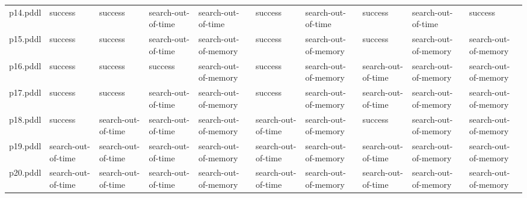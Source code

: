\documentclass{article}
\begin{document}
\begin{tabular}{@{}lrrrrrrrrr@{}}
p14.pddl & \multicolumn{1}{|l|}{success} & \multicolumn{1}{|l|}{success} & \multicolumn{1}{|l|}{search-out-of-time} & \multicolumn{1}{|l|}{search-out-of-time} & \multicolumn{1}{|l|}{success} & \multicolumn{1}{|l|}{search-out-of-time} & \multicolumn{1}{|l|}{success} & \multicolumn{1}{|l|}{search-out-of-time} & \multicolumn{1}{|l|}{success} \\
p15.pddl & \multicolumn{1}{|l|}{success} & \multicolumn{1}{|l|}{success} & \multicolumn{1}{|l|}{search-out-of-time} & \multicolumn{1}{|l|}{search-out-of-memory} & \multicolumn{1}{|l|}{success} & \multicolumn{1}{|l|}{search-out-of-memory} & \multicolumn{1}{|l|}{success} & \multicolumn{1}{|l|}{search-out-of-memory} & \multicolumn{1}{|l|}{search-out-of-memory} \\
p16.pddl & \multicolumn{1}{|l|}{success} & \multicolumn{1}{|l|}{success} & \multicolumn{1}{|l|}{success} & \multicolumn{1}{|l|}{search-out-of-memory} & \multicolumn{1}{|l|}{success} & \multicolumn{1}{|l|}{search-out-of-memory} & \multicolumn{1}{|l|}{search-out-of-time} & \multicolumn{1}{|l|}{search-out-of-memory} & \multicolumn{1}{|l|}{search-out-of-memory} \\
p17.pddl & \multicolumn{1}{|l|}{success} & \multicolumn{1}{|l|}{success} & \multicolumn{1}{|l|}{search-out-of-time} & \multicolumn{1}{|l|}{search-out-of-memory} & \multicolumn{1}{|l|}{success} & \multicolumn{1}{|l|}{search-out-of-memory} & \multicolumn{1}{|l|}{search-out-of-time} & \multicolumn{1}{|l|}{search-out-of-memory} & \multicolumn{1}{|l|}{search-out-of-memory} \\
p18.pddl & \multicolumn{1}{|l|}{success} & \multicolumn{1}{|l|}{search-out-of-time} & \multicolumn{1}{|l|}{search-out-of-time} & \multicolumn{1}{|l|}{search-out-of-memory} & \multicolumn{1}{|l|}{search-out-of-time} & \multicolumn{1}{|l|}{search-out-of-memory} & \multicolumn{1}{|l|}{success} & \multicolumn{1}{|l|}{search-out-of-memory} & \multicolumn{1}{|l|}{search-out-of-memory} \\
p19.pddl & \multicolumn{1}{|l|}{search-out-of-time} & \multicolumn{1}{|l|}{search-out-of-time} & \multicolumn{1}{|l|}{search-out-of-time} & \multicolumn{1}{|l|}{search-out-of-memory} & \multicolumn{1}{|l|}{search-out-of-time} & \multicolumn{1}{|l|}{search-out-of-memory} & \multicolumn{1}{|l|}{search-out-of-time} & \multicolumn{1}{|l|}{search-out-of-memory} & \multicolumn{1}{|l|}{search-out-of-memory} \\
p20.pddl & \multicolumn{1}{|l|}{search-out-of-time} & \multicolumn{1}{|l|}{search-out-of-time} & \multicolumn{1}{|l|}{search-out-of-time} & \multicolumn{1}{|l|}{search-out-of-memory} & \multicolumn{1}{|l|}{search-out-of-time} & \multicolumn{1}{|l|}{search-out-of-memory} & \multicolumn{1}{|l|}{search-out-of-time} & \multicolumn{1}{|l|}{search-out-of-memory} & \multicolumn{1}{|l|}{search-out-of-memory} \\
\end{tabular}
\end{document}
